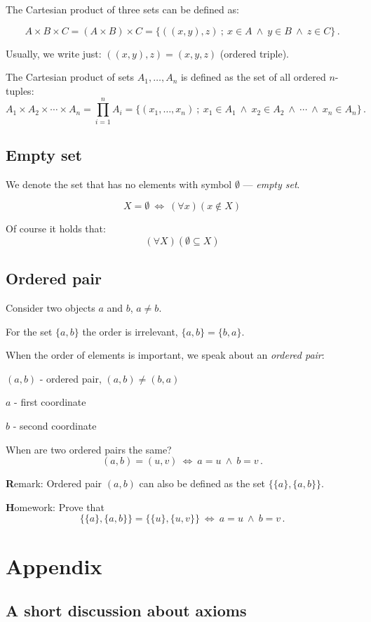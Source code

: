 \documentclass[11pt,paper=b5,footinclude,headinclude]{scrbook} %
\def\inn {{~\wedge~}}
\def\cee {{~\Leftrightarrow~}}
\theoremstyle{remark}
\theoremstyle{definition} %
\begin{document}
The Cartesian product of three sets can be defined as:

$$A\times B\times C = (A\times B)\times C= \{((x,y),z)~;~x\in A \inn y\in B\inn z\in C\}\,.$$

Usually, we write just: $((x,y),z) = (x,y,z)$ (ordered triple).

\bigskip
The Cartesian product of sets $A_1,\ldots, A_n$ is defined as the set of all ordered
$n$-tuples:
$$A_1\times A_2\times\cdots \times A_n = \prod_{i = 1}^n A_i = \{(x_1,\ldots, x_n)~;~x_1\in A_1\inn x_2\in A_2\inn\cdots \inn x_n\in A_n\}\,.$$


\subsection*{Empty set}
We denote the set that has no elements with symbol $\emptyset$ --- {\em empty set}.

$$X = \emptyset \cee (\forall x)(x\not\in X)$$

Of course it holds that:
$$(\forall X) (\emptyset \subseteq X)$$


\subsection*{Ordered pair}

Consider two objects $a$ and $b$, $a\neq b$.

For the set $\{a,b\}$ the order is irrelevant, $\{a,b\} = \{b,a\}$.

When the order of elements is important, we speak about an {\em ordered pair}:

$(a,b)$ - ordered pair, $(a,b)\neq (b,a)$

$a$ - first coordinate

$b$ - second coordinate

When are two ordered pairs the same?
$$(a,b) = (u,v) \cee a = u \inn b = v\,.$$

\medskip
{\textbf Remark:}
Ordered pair  $(a,b)$ can also be defined as the set $\{\{a\},\{a,b\}\}$.

\medskip
{\textbf Homework:}
Prove that $$\{\{a\},\{a,b\}\} = \{\{u\},\{u,v\}\}\cee a = u \inn b = v\,.$$
\section*{Appendix}

\subsection*{A short discussion about axioms}
\end{document}
